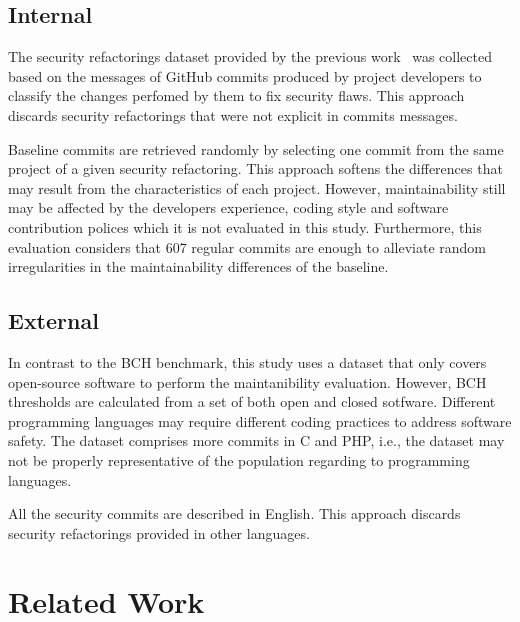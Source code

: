 \documentclass[10pt,conference]{IEEEtran}
\begin{document}
{\subsection{Internal}

The security refactorings dataset provided by the previous work~\cite{Reis:2017:IJSSE} 
was collected based on the messages of GitHub commits produced by project developers 
to classify the changes perfomed by them to fix security flaws. This approach 
discards security refactorings that were not explicit in commits messages.

Baseline commits are retrieved randomly by selecting one commit from the same project of a given security refactoring. This approach softens the differences that may result from the
characteristics of each project. However, maintainability still may be affected by the developers experience, coding style and software contribution polices which it is not evaluated in this study. Furthermore, this evaluation considers that 607 regular commits are enough to alleviate random irregularities in the maintainability differences of the baseline. 


\subsection{External}

In contrast to the BCH benchmark, this study uses a dataset that only covers open-source software to perform the maintanibility evaluation. However, BCH thresholds are calculated from a set of both open and closed sotfware. Different programming languages may require different coding practices to address software safety. The dataset
comprises more commits in C and PHP, i.e., the dataset may not be properly representative of the population regarding to programming languages. 

All the security commits are described in English. This approach discards security refactorings provided in other languages.

\section{Related Work}\label{sec:rw}

}
\end{document}
